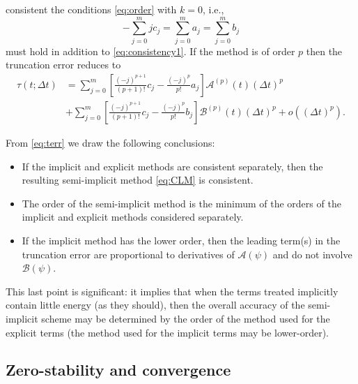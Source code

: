\documentclass[12pt]{article}
\newcommand{\dt}{\Delta t}
\newcommand{\opA}{\mathcal{A}}
\newcommand{\opB}{\mathcal{B}}
\begin{document}
consistent the conditions \eqref{eq:order} with $k=0$, i.e.,
\begin{equation}
  -\sum_{j=0}^{m} j c_j = \sum_{j=0}^{m} a_j = \sum_{j=0}^{m} b_j 
\label{eq:consistency2}
\end{equation}
must hold in addition to \eqref{eq:consistency1}.
If the method is of order $p$ then the truncation error reduces to
\begin{align}
  \tau(t;\dt) &= \sum_{j=0}^{m} \left[\frac{(-j)^{p+1}}{{(p+1)}!}c_j
  - \frac{(-j)^{p}}{p!}a_j \right]\opA^{(p)}(t)(\dt)^p \nonumber\\
       &+ \sum_{j=0}^{m} \left[\frac{(-j)^{p+1}}{{(p+1)}!}c_j
  - \frac{(-j)^{p}}{p!}b_j \right]\opB^{(p)}(t)(\dt)^p 
       + o\left((\dt)^{p}\right) .
\label{eq:terr}
\end{align}

\pagebreak[3]
From \eqref{eq:terr} we draw the following conclusions:
\begin{itemize}
\setlength{\itemsep}{2pt} \setlength{\parsep}{0pt}
\setlength{\topsep}{0pt} \setlength{\partopsep}{0pt}
\item If the implicit and explicit methods are consistent separately, 
then the resulting semi-implicit method \eqref{eq:CLM} is consistent.
\item The order of the semi-implicit method is the minimum of the 
orders of the implicit and explicit methods considered separately.
\item If the implicit method has the lower order, then the
leading term(s) in the truncation error are proportional to derivatives
of $\opA(\psi)$ and do not involve $\opB(\psi)$.
\end{itemize}
This last point is significant:  it implies that when the terms treated
implicitly contain little energy (as they should), then the overall accuracy
of the semi-implicit scheme may be determined by the order of the method used
for the explicit terms (the method used for the implicit terms may be
lower-order).

\pagebreak[3]
\subsection{Zero-stability and convergence\label{sec:convergence}}
\end{document}
